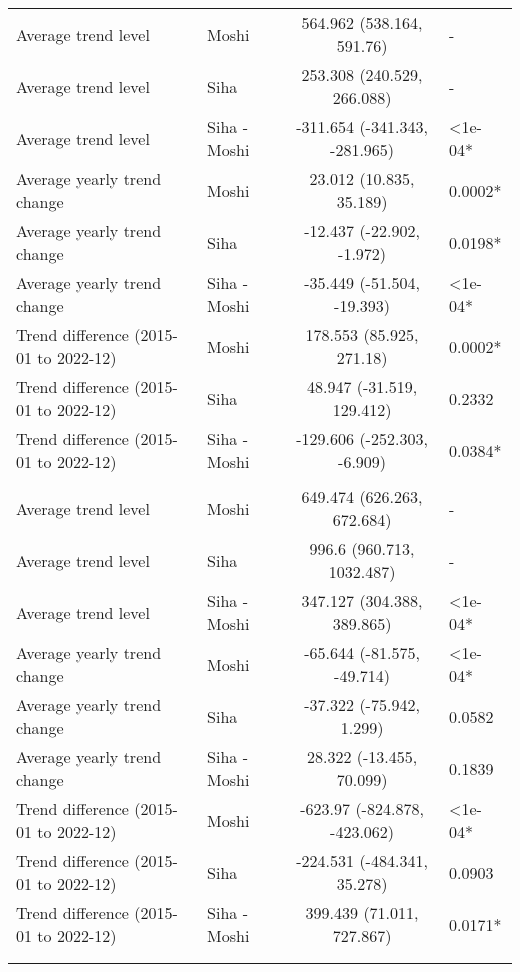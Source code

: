 \begin{longtable}{l|lcl}
\midrule\addlinespace[2.5pt]
\multicolumn{4}{l}{Diabetes Mellitus} \\[2.5pt] 
\midrule\addlinespace[2.5pt]
Average trend level & Moshi & 564.962 (538.164, 591.76) & - \\ 
Average trend level & Siha & 253.308 (240.529, 266.088) & - \\ 
Average trend level & Siha - Moshi & -311.654 (-341.343, -281.965) & <1e-04* \\ 
Average yearly trend change & Moshi & 23.012 (10.835, 35.189) & 0.0002* \\ 
Average yearly trend change & Siha & -12.437 (-22.902, -1.972) & 0.0198* \\ 
Average yearly trend change & Siha - Moshi & -35.449 (-51.504, -19.393) & <1e-04* \\ 
Trend difference (2015-01 to 2022-12) & Moshi & 178.553 (85.925, 271.18) & 0.0002* \\ 
Trend difference (2015-01 to 2022-12) & Siha & 48.947 (-31.519, 129.412) & 0.2332 \\ 
Trend difference (2015-01 to 2022-12) & Siha - Moshi & -129.606 (-252.303, -6.909) & 0.0384* \\ 
\midrule\addlinespace[2.5pt]
\multicolumn{4}{l}{Gastrointestinal Infections} \\[2.5pt] 
\midrule\addlinespace[2.5pt]
Average trend level & Moshi & 649.474 (626.263, 672.684) & - \\ 
Average trend level & Siha & 996.6 (960.713, 1032.487) & - \\ 
Average trend level & Siha - Moshi & 347.127 (304.388, 389.865) & <1e-04* \\ 
Average yearly trend change & Moshi & -65.644 (-81.575, -49.714) & <1e-04* \\ 
Average yearly trend change & Siha & -37.322 (-75.942, 1.299) & 0.0582 \\ 
Average yearly trend change & Siha - Moshi & 28.322 (-13.455, 70.099) & 0.1839 \\ 
Trend difference (2015-01 to 2022-12) & Moshi & -623.97 (-824.878, -423.062) & <1e-04* \\ 
Trend difference (2015-01 to 2022-12) & Siha & -224.531 (-484.341, 35.278) & 0.0903 \\ 
Trend difference (2015-01 to 2022-12) & Siha - Moshi & 399.439 (71.011, 727.867) & 0.0171* \\ 
\midrule\addlinespace[2.5pt]
\multicolumn{4}{l}{Infectious Eye Disease} \\[2.5pt] 
\midrule\addlinespace[2.5pt]

\end{longtable}
